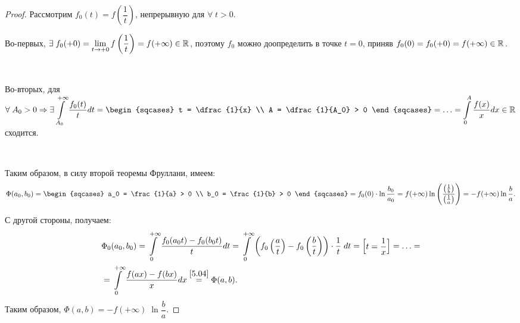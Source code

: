 \begin{proof}
	Рассмотрим $ f_0(t) = f\left(\dfrac{1}{t}\right)  $, непрерывную для $ \forall \; t > 0 $.

	Во-первых,
	$ \exists \; f_0(+0) = \lim\limits_{t \to +0} f \left(\dfrac{1}{t}\right) = f (+\infty ) \in \mathbb{R}^{}$,
	поэтому $ f_0 $ можно доопределить в точке $ t = 0 $, приняв
	$ f_0(0) = f_0(+0) = f(+\infty) \in \mathbb{R}^{} $.

	$  $

	Во-вторых, для
	$ \forall \; A_0 > 0 \Rightarrow \exists \dintl_{A_0}^{+\infty} \dfrac{f_0(t)}{t} dt =
	\begin{sqcases}
	t = \dfrac{1}{x} \\
	A = \dfrac{1}{A_0} > 0
	\end{sqcases}
	= \ldots =
	\dintl_0^A \dfrac{f(x)}{x} dx \in \R{} $
	сходится.

	$  $

	Таким образом, в силу второй теоремы Фруллани, имеем:
	\begin{equation*}
	\Phi (a_0, b_0)
	= \begin{sqcases}
	a_0 = \frac{1}{a} > 0 \\
	b_0 = \frac{1}{b} > 0
	\end{sqcases}
	= f_0 (0) \cdot \ln \dfrac{b_0}{a_0}
	= f(+\infty) \ln \left(\dfrac{\parenthesis{\frac{1}{b}}}{\parenthesis{\frac{1}{a}}}\right)
	= - f(+\infty) \ln \frac{b}{a}.
	\end{equation*}

	С другой стороны, получаем:
	\begin{align*}
	& \Phi_0 (a_0, b_0)
	= \displaystyle\int\limits_0^{+\infty} \dfrac{f_0(a_0 t)-f_0(b_0 t)}{t} dt
	= \displaystyle\int\limits_0^{+ \infty} \left(f_0 \left(\dfrac{a}{t} \right) - f_0 \left(\dfrac{b}{t} \right) \right) \cdot \dfrac{1}{t} \; dt = \left[\begin{matrix} t = \dfrac{1}{x} \end{matrix}\right]
	= \ldots
	= \\ &
	= \displaystyle\int\limits_0^{+\infty} \dfrac{f(ax)-f(bx)}{x} dx
	\overset{\eqref{5.04}}{=} \Phi (a, b).
	\end{align*}
	Таким образом, $ \Phi (a, b) = - f(+\infty) \; \ln \dfrac{b}{a}. $
\end{proof}
